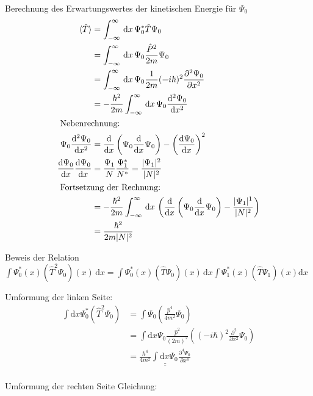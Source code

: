  Berechnung des Erwartungswertes der kinetischen Energie für $\Psi _0$
\begin{align}
\langle \hat T \rangle &= \int_{-\infty}^{\infty} \,\mathrm{d}x\, \Psi _0^* \hat T \Psi _0\\
&= \int_{-\infty}^{\infty} \,\mathrm{d}x\, \Psi _0 \frac{\hat P ^2}{2m} \Psi _0 \\
&=\int_{-\infty}^{\infty} \,\mathrm{d}x\, \Psi _0\frac{1}{2m}(\--i\hbar)^2 \frac{\partial ^2 \Psi _0}{\partial x^2}\\
&= \--\frac{\hbar ^2}{2m} \int_{-\infty}^{\infty} \,\mathrm{d}x\, \Psi _0 \frac{\mathrm{d}^2 \Psi _0}{\mathrm{d}x^2}\\
\intertext{
    Nebenrechnung:
}
\Psi _0 \frac{\mathrm{d}^2 \Psi _0}{\mathrm{d}x^2}&= \frac{\mathrm{d}}{\mathrm{d}x}\left(\Psi _0 \frac{\mathrm{d}}{\mathrm{d}x} \Psi _0\right)
-\left(\frac{\mathrm{d}\Psi _0}{\mathrm{d}x}\right)^2\\
\frac{\mathrm{d}\Psi _0}{\mathrm{d}x} \frac{\mathrm{d}\Psi _0}{\mathrm{d}x} &= \frac{\Psi _1}{N} \frac{\Psi _1^*}{N^*}=\frac{\lvert\Psi _1\rvert^2}{\lvert N\rvert^2}\\
\intertext{
    Fortsetzung der Rechnung:
}
&=\-- \frac{\hbar ^2}{2m}\int_{-\infty}^{\infty} \,\mathrm{d}x\, \left(\frac{\mathrm{d}}{\mathrm{d}x}\left(\Psi _0 \frac{\mathrm{d}}{\mathrm{d}x} \Psi _0\right)-\frac{\lvert\Psi _1\rvert^1}{\lvert N\rvert^2} \right)\\
&=\frac{\hbar ^2}{2m \lvert N\rvert^2}
\end{align}

Beweis der Relation $\int \Psi _0^*(x)(\hat T ^2 \Psi _0)(x)\,\mathrm{d}x = \int \Psi_0^*(x) (\hat T \Psi _0 )(x) \,\mathrm{d}x \int \Psi _1^* (x)(\hat T \Psi _1)(x)\mathrm{d}x $

Umformung der linken Seite:
\begin{align}
    \int \mathrm{d}x \Psi _0^* (\hat T ^2 \Psi _0 ) &= \int \Psi _0 \left(\frac{\hat p ^4}{4m^2}\Psi _0 \right)\\
    &=\int \mathrm{d}x \Psi _0 \frac{\hat p ^2}{(2m)^2} \left((-i \hbar)^2 \frac{\partial ^2}{\partial x^2} \Psi _0 \right) \\   
    &=\underline{\underline{\frac{\hbar ^4}{4m^2}\int \mathrm{d}x \Psi _0 \frac{\partial ^4 \Psi _0}{\partial x^4}}}\\
\end{align}

Umformung der rechten Seite Gleichung:

